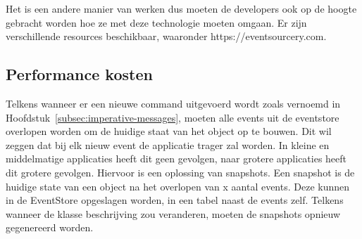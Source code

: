 Het is een andere manier van werken dus moeten de developers ook op de hoogte gebracht worden hoe ze met deze technologie moeten omgaan. Er zijn verschillende resources beschikbaar, waaronder https://eventsourcery.com.

\subsection{Performance kosten}
\label{subsec:performance-kosten}

Telkens wanneer er een nieuwe command uitgevoerd wordt zoals vernoemd in Hoofdstuk~\ref{subsec:imperative-messages}, moeten alle events uit de eventstore overlopen worden om de huidige staat van het object op te bouwen. Dit wil zeggen dat bij elk nieuw event de applicatie trager zal worden. In kleine en middelmatige applicaties heeft dit geen gevolgen, naar grotere applicaties heeft dit grotere gevolgen. Hiervoor is een oplossing van snapshots. Een snapshot is de huidige state van een object na het overlopen van x aantal events. Deze kunnen in de EventStore opgeslagen worden, in een tabel naast de events zelf. Telkens wanneer de klasse beschrijving zou veranderen, moeten de snapshots opnieuw gegenereerd worden.